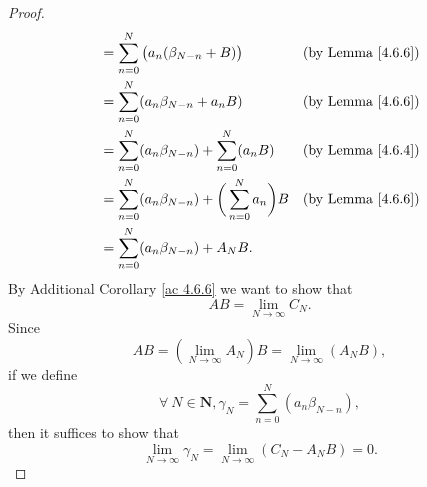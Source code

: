 \begin{proof}
\begin{align*}
                                       & = \sum_{n = 0}^N \big(a_n (\beta_{N - n} + B)\big)                      & \text{(by Lemma \ref{4.6.6})} \\
                                       & = \sum_{n = 0}^N (a_n \beta_{N - n} + a_n B)                            & \text{(by Lemma \ref{4.6.6})} \\
                                       & = \sum_{n = 0}^N (a_n \beta_{N - n}) + \sum_{n = 0}^N (a_n B)           & \text{(by Lemma \ref{4.6.4})} \\
                                       & = \sum_{n = 0}^N (a_n \beta_{N - n}) + \bigg(\sum_{n = 0}^N a_n\bigg) B & \text{(by Lemma \ref{4.6.6})} \\
                                       & = \sum_{n = 0}^N (a_n \beta_{N - n}) + A_N B.
    \end{align*}
    By Additional Corollary \ref{ac 4.6.6} we want to show that
    \[
        AB = \lim_{N \to \infty} C_N.
    \]
    Since
    \[
        AB = (\lim_{N \to \infty} A_N) B = \lim_{N \to \infty} (A_N B),
    \]
    if we define
    \[
        \forall\ N \in \mathbf{N}, \gamma_N = \sum_{n = 0}^N (a_n \beta_{N - n}),
    \]
    then it suffices to show that
    \[
        \lim_{N \to \infty} \gamma_N = \lim_{N \to \infty} (C_N - A_N B) = 0.
    \]


\end{proof}
